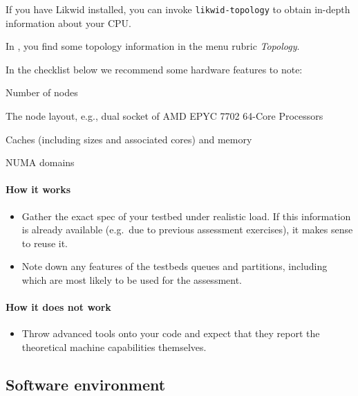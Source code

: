 \begin{instructions}{\likwid}
 If you have Likwid installed, you can invoke \texttt{likwid-topology} to obtain
 in-depth information about your CPU.
\end{instructions}

\begin{instructions}{\maqao}
 In \maqao, you find some topology information in the menu rubric \emph{Topology}. 
\end{instructions}

In the checklist below we recommend some hardware features to note:
\begin{checklist}
\item Number of nodes
\item The node layout, e.g., dual socket of AMD EPYC 7702 64-Core Processors
\item Caches (including sizes and associated cores) and memory 
\item NUMA domains
\end{checklist}

\paragraph*{How it works}

\begin{itemize}[noitemsep]
  \item[$\boxplus$] Gather the exact spec of your testbed under realistic load. If this information is already available (e.g.~due to previous assessment exercises), it makes sense to reuse it.
  \item[$\boxplus$] Note down any features of the testbeds queues and partitions, including which are most likely to be used for the assessment.
\end{itemize}


\paragraph*{How it does not work}

\begin{itemize}[noitemsep]
  \item[$\boxminus$] Throw advanced tools onto your code and expect that they report the theoretical machine capabilities themselves.
\end{itemize}

\subsection{Software environment}
\label{subsection:preparation:software-environment}

